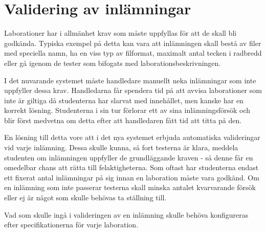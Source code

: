 \section{Validering av inlämningar}

Laborationer har i allmänhet krav som måste uppfyllas för att de skall bli godkända. Typiska exempel på detta kan vara att inlämningen skall bestå av filer med speciella namn, ha en viss typ av filformat, maximalt antal tecken i radbredd eller gå igenom de tester som bifogats med laborationsbeskrivningen.

I det nuvarande systemet måste handledare manuellt neka inlämningar som inte uppfyller dessa krav. Handledarna får spendera tid på att avvisa laborationer som inte är giltiga då studenterna har slarvat med innehållet, men kanske har en korrekt lösning. Studenterna i sin tur förlorar ett av sina inlämningsförsök och blir först medvetna om detta efter att handledaren fått tid att titta på den.

En lösning till detta vore att i det nya systemet erbjuda automatiska valideringar vid varje inlämning. Dessa skulle kunna, så fort testerna är klara, meddela studenten om inlämningen uppfyller de grundläggande kraven - så denne får en omedelbar chans att rätta till felaktigheterna. Som oftast har studenterna endast ett fixerat antal inlämningar på sig innan en laboration måste vara godkänd. Om en inlämning som inte passerar testerna skall minska antalet kvarvarande försök eller ej är något som skulle behövas ta ställning till.

Vad som skulle ingå i valideringen av en inlämning skulle behöva konfigureras efter specifikationerna för varje laboration. 
